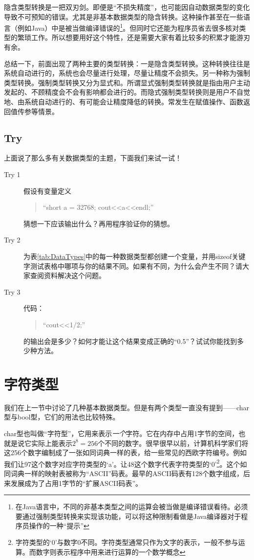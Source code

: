 隐含类型转换是一把双刃剑。即便是“不损失精度”，也可能因自动数据类型的变化导致不可预知的错误。尤其是非基本数据类型的隐含转换。这种操作甚至在一些语言（例如Java）中是被当做编译错误的\footnote{在Java语言中，不同的非基本类型之间的运算会被当做是编译错误看待。必须要通过强制类型转换来实现该功能，可以将这种限制看做是Java编译器对于程序员操作的一种“提示”}。但同时它还能为程序员省去很多核对类型的繁琐工作。所以想要用好这个特性，还是需要大家有着比较多的积累才能游刃有余。

总结一下，前面出现了两种主要的类型转换：一是隐含类型转换。这种转换往往是系统自动进行的，系统也会尽量进行处理，尽量让精度不会损失。另一种称为强制类型转换。强制类型转换又分为显式和。所谓显式强制类型转换就是指由用户主动发起的、不顾精度会不会有影响都会进行的。而隐式强制类型转换则是用户不自觉地、由系统自动进行的、有可能会让精度降低的转换。常发生在赋值操作、函数返回值传参等情景。


\subsection{Try}

上面说了那么多有关数据类型的主题，下面我们来试一试！

\begin{description}
	\item[Try 1] 
		假设有变量定义
		\begin{quote}“short a = 32768; cout<<a<<endl;”\end{quote}
		猜想一下应该输出什么？再用程序验证你的猜想。
	\item[Try 2] 
		为表\ref{tab:DataTypes}中的每一种数据类型都创建一个变量，并用sizeof关键字测试表格中哪项与你的结果不同。如果有不同，为什么会产生不同？请大家查阅资料解决这个问题。
	\item[Try 3] 
		代码：
		\begin{quote}“cout<<1/2;” \end{quote}
		的输出会是多少？如何才能让这个结果变成正确的“0.5”？试试你能找到多少种方法。
\end{description}

\section{字符类型}
我们在上一节中讨论了几种基本数据类型。但是有两个类型一直没有提到——char型与bool型，它们的用法也比较特殊。

char型也叫做“字符型”，它用来表示\emph{一个}字符。它在内存中占用1字节的空间，也就是说它实际上能表示$2^8=256$个不同的数字。很早很早以前，计算机科学家们将这256个数字编制成了一张如同词典一样的表，给一些常见的西欧字符编号。例如我们让97这个数字对应字符类型的‘a’。让48这个数字代表字符类型的‘0’\footnote{字符类型的‘0’与数字0不同。字符类型通常只作为文字的表示，一般不参与运算。而数字则表示程序中用来进行运算的一个数学概念}。这个如同词典一样的映射表被称为“ASCII”码表。最早的ASCII码表有128个数字组成，后来发展成为了占用1字节的“扩展ASCII码表”。

